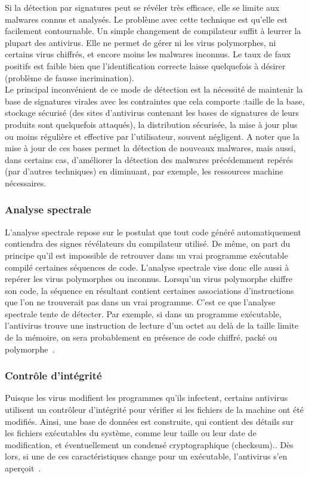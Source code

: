 Si la détection par signatures peut se révéler très efficace, elle se limite aux
malwares connus et analysés. Le problème avec cette technique est qu'elle est facilement
contournable. Un simple changement de compilateur suffit à leurrer la plupart des antivirus. Elle ne permet de gérer ni les virus polymorphes, ni certains virus chiffrés, et encore moins les malwares inconnus. Le taux de faux positifs est faible bien que l'identification correcte laisse quelquefois à désirer (problème de fausse incrimination).\\

Le principal inconvénient  de ce mode de détection est la nécessité de maintenir la base de signatures virales avec les contraintes que cela comporte :taille de la base, stockage sécurisé (des sites d'antivirus contenant les bases de signatures de leurs produits sont quelquefois attaqués), la distribution sécurisée, la mise à jour plus ou moins régulière et effective par l'utilisateur, souvent négligent. A noter que la mise à
jour de ces bases permet la détection de nouveaux malwares, mais aussi, dans certains cas, d'améliorer la détection des malwares précédemment repérés (par d'autres techniques) en diminuant, par exemple, les ressources machine nécessaires.\\
\subsubsection{Analyse spectrale}
L'analyse spectrale repose sur le postulat que tout code généré automatiquement contiendra des signes révélateurs du compilateur utilisé. De même, on part du principe qu'il est impossible de retrouver dans un vrai programme exécutable compilé certaines séquences de code. L'analyse spectrale vise donc elle aussi à repérer les virus polymorphes ou inconnus. Lorsqu'un virus polymorphe chiffre son code, la séquence en résultant contient certaines associations d'instructions que l'on ne trouverait pas dans un vrai programme. C'est ce que l'analyse spectrale tente de détecter. Par exemple, si dans un programme exécutable, l'antivirus trouve une instruction de lecture d'un octet au delà de la taille limite de la mémoire, on sera
probablement en présence de code chiffré, packé ou polymorphe~\cite{anti}.\\
\subsubsection{Contrôle d'intégrité}
Puisque les virus modifient les programmes qu'ils infectent, certains antivirus utilisent un contrôleur d'intégrité pour vérifier si les fichiers de la machine ont été modifiés. Ainsi, une base de données est construite, qui contient des détails sur les fichiers exécutables du système, comme leur taille ou leur date de modification, et éventuellement un condensé cryptographique (checksum).. Dès lors, si une de ces caractéristiques change pour un exécutable, l'antivirus s'en aperçoit~\cite{antiv}.

